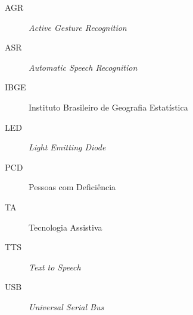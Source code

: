 \begin{description}
	\item[AGR]   \emph{Active Gesture Recognition}
	\item[ASR]   \emph{Automatic Speech Recognition}
	\item[IBGE]  Instituto Brasileiro de Geografia Estat\'istica
	\item[LED]   \emph{Light Emitting Diode}
	\item[PCD]   Pessoas com Deficiência
	\item[TA]    Tecnologia Assistiva
	\item[TTS]   \emph{Text to Speech}
	\item[USB]   \emph{Universal Serial Bus} 
\end{description}
